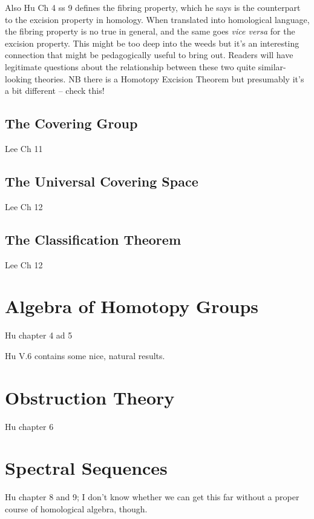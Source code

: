 \documentclass[oneside,english]{amsbook}
\numberwithin{section}{chapter}
\theoremstyle{plain}
\theoremstyle{definition}
\begin{document}
	Also Hu Ch 4 ss 9 defines the fibring property, which he says is the counterpart to the excision property in homology. When translated into homological language, the fibring property is no true in general, and the same goes \emph{vice versa} for the excision property. This might be too deep into the weeds but it's an interesting connection that might be pedagogically useful to bring out. Readers will have legitimate questions about the relationship between these two quite similar-looking theories. NB there is a Homotopy Excision Theorem but presumably it's a bit different -- check this!

	\section{The Covering Group}
	
	Lee Ch 11
	
	\section{The Universal Covering Space}
	
	Lee Ch 12

	\section{The Classification Theorem}
	
	Lee Ch 12

	\chapter{Algebra of Homotopy Groups}	

	Hu chapter 4 ad 5
	
	Hu V.6 contains some nice, natural results.

	\chapter{Obstruction Theory}	

	Hu chapter 6

	\chapter{Spectral Sequences}	

	Hu chapter 8 and 9; I don't know whether we can get this far without a proper course of homological algebra, though.
\end{document}
